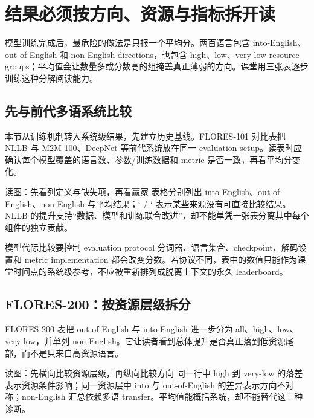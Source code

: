 \section{结果必须按方向、资源与指标拆开读}

模型训练完成后，最危险的做法是只报一个平均分。两百语言包含 into-English、out-of-English 和 non-English directions，也包含 high、low、very-low resource groups；平均值会让数量多或分数高的组掩盖真正薄弱的方向。课堂用三张表逐步训练这种分解阅读能力。

\subsection{先与前代多语系统比较}

本节从训练机制转入系统级结果，先建立历史基线。FLORES-101 对比表把 NLLB 与 M2M-100、DeepNet 等前代系统放在同一 evaluation setup。读表时应确认每个模型覆盖的语言数、参数/训练数据和 metric 是否一致，再看平均分变化。


\begin{knowledgebox}{读图：先看列定义与缺失项，再看赢家}
表格分别列出 into-English、out-of-English、non-English 与平均结果；`-/-` 表示某些来源没有可直接比较结果。NLLB 的提升支持“数据、模型和训练联合改进”，却不能单凭一张表分离其中每个组件的独立贡献。
\end{knowledgebox}

\begin{warningbox}{模型代际比较要控制 evaluation protocol}
分词器、语言集合、checkpoint、解码设置和 metric implementation 都会改变分数。若协议不同，表中的数值只能作为课堂时间点的系统级参考，不应被重新排列成脱离上下文的永久 leaderboard。
\end{warningbox}

\subsection{FLORES-200：按资源层级拆分}

FLORES-200 表把 out-of-English 与 into-English 进一步分为 all、high、low、very-low，并单列 non-English。它让读者看到总体提升是否真正落到低资源尾部，而不是只来自高资源语言。


\begin{knowledgebox}{读图：先横向比较资源层级，再纵向比较方向}
同一行中 high 到 very-low 的落差表示资源条件影响；同一资源层中 into 与 out-of-English 的差异表示方向不对称；non-English 汇总依赖多语 transfer。平均值能概括系统，却不能替代这三种诊断。
\end{knowledgebox}

